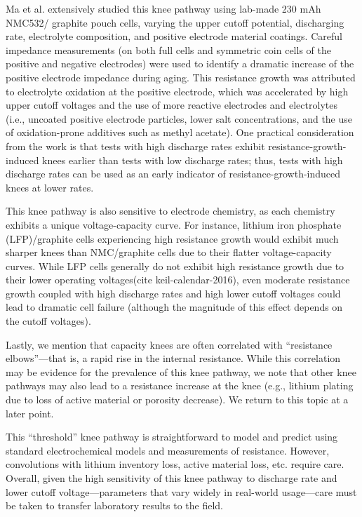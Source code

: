 \documentclass[journal=jpclcd,manuscript=article]{achemso}
\begin{document}
Ma et al.\cite{ma_editors_2019} extensively studied this knee pathway using lab-made 230 mAh NMC532/ graphite pouch cells, varying the upper cutoff potential, discharging rate, electrolyte composition, and positive electrode material coatings. Careful impedance measurements (on both full cells and symmetric coin cells of the positive and negative electrodes) were used to identify a dramatic increase of the positive electrode impedance during aging. This resistance growth was attributed to electrolyte oxidation at the positive electrode, which was accelerated by high upper cutoff voltages and the use of more reactive electrodes and electrolytes (i.e., uncoated positive electrode particles, lower salt concentrations, and the use of oxidation-prone additives such as methyl acetate). One practical consideration from the work is that tests with high discharge rates exhibit resistance-growth-induced knees earlier than tests with low discharge rates; thus, tests with high discharge rates can be used as an early indicator of resistance-growth-induced knees at lower rates.

This knee pathway is also sensitive to electrode chemistry, as each chemistry exhibits a unique voltage-capacity curve. For instance, lithium iron phosphate (LFP)/graphite cells experiencing high resistance growth would exhibit much sharper knees than NMC/graphite cells due to their flatter voltage-capacity curves. While LFP cells generally do not exhibit high resistance growth due to their lower operating voltages\cite{safari_aging_2011}(cite keil-calendar-2016), even moderate resistance growth coupled with high discharge rates and high lower cutoff voltages could lead to dramatic cell failure (although the magnitude of this effect depends on the cutoff voltages).

Lastly, we mention that capacity knees are often correlated with ``resistance elbows''---that is, a rapid rise in the internal resistance. While this correlation may be evidence for the prevalence of this knee pathway, we note that other knee pathways may also lead to a resistance increase at the knee (e.g., lithium plating due to loss of active material or porosity decrease). We return to this topic at a later point.

This ``threshold'' knee pathway is straightforward to model and predict using standard electrochemical models and measurements of resistance. However, convolutions with lithium inventory loss, active material loss, etc. require care. Overall, given the high sensitivity of this knee pathway to discharge rate and lower cutoff voltage---parameters that vary widely in real-world usage---care must be taken to transfer laboratory results to the field. 
\end{document}
